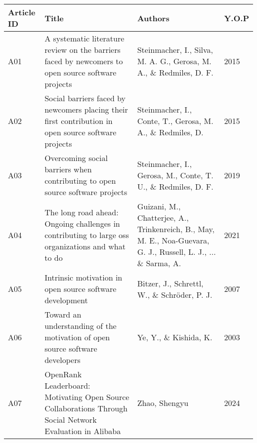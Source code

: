 \begin{landscape}
\begin{center}
\begin{longtable}{ | m{5em} | m{25em}| m{22em} | m{4em} | }
      \hline
      Article ID & Title                                                                                                                                         & Authors                                                                                                         & Y.O.P \\ \hline
      A01        & A systematic literature review on the barriers faced by newcomers to open source software projects                                            & Steinmacher, I., Silva, M. A. G., Gerosa, M. A., \& Redmiles, D. F.                                             & 2015  \\ \hline
      A02        & Social barriers faced by newcomers placing their first contribution in open source software projects                                          & Steinmacher, I., Conte, T., Gerosa, M. A., \& Redmiles, D.                                                      & 2015  \\  \hline
      A03        & Overcoming social barriers when contributing to open source software projects                                                                 & Steinmacher, I., Gerosa, M., Conte, T. U., \& Redmiles, D. F.                                                   & 2019  \\ \hline
      A04        & The long road ahead: Ongoing challenges in contributing to large oss organizations and what to do                                             & Guizani, M., Chatterjee, A., Trinkenreich, B., May, M. E., Noa-Guevara, G. J., Russell, L. J., ... \& Sarma, A. & 2021  \\ \hline
      A05        & Intrinsic motivation in open source software development                                                                                      & Bitzer, J., Schrettl, W., \& Schröder, P. J.                                                                    & 2007  \\ \hline
      A06        & Toward an understanding of the motivation of open source software developers                                                                  & Ye, Y., \& Kishida, K.                                                                                          & 2003  \\ \hline
      A07        & OpenRank Leaderboard: Motivating Open Source Collaborations Through Social Network Evaluation in Alibaba                                      & Zhao, Shengyu                                                                                                   & 2024  \\ \hline

\end{longtable}
\end{center}
\end{landscape}

